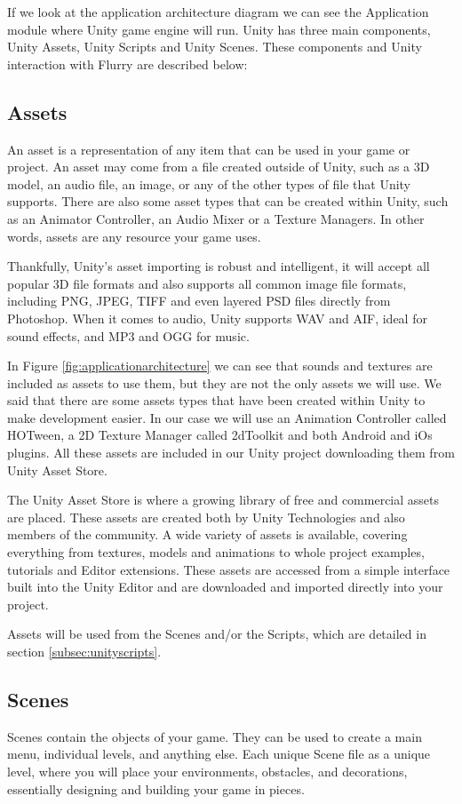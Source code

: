 If we look at the application architecture diagram we can see the Application module where Unity game engine will run. Unity has three main components, Unity Assets, Unity Scripts and Unity Scenes. These components and Unity interaction with Flurry are described below:

\subsection{Assets}
An asset is a representation of any item that can be used in your game or project. An asset may come from a file created outside of Unity, such as a 3D model, an audio file, an image, or any of the other types of file that Unity supports. There are also some asset types that can be created within Unity, such as an Animator Controller, an Audio Mixer or a Texture Managers. In other words, assets are any resource your game uses.

Thankfully, Unity’s asset importing is robust and intelligent, it will accept all popular 3D file formats and also supports all common image file formats, including PNG, JPEG, TIFF and even layered PSD files directly from Photoshop. When it comes to audio, Unity supports WAV and AIF, ideal for sound effects, and MP3 and OGG for music.

In Figure \ref{fig:applicationarchitecture} we can see that sounds and textures are included as assets to use them, but they are not the only assets we will use. We said that there are some assets types that have been created within Unity to make development easier. In our case we will use an Animation Controller called HOTween, a 2D Texture Manager called 2dToolkit and both Android and iOs plugins. All these assets are included in our Unity project downloading them from Unity Asset Store.

The Unity Asset Store is where a growing library of free and commercial assets are placed. These assets are created both by Unity Technologies and also members of the community. A wide variety of assets is available, covering everything from textures, models and animations to whole project examples, tutorials and Editor extensions. These assets are accessed from a simple interface built into the Unity Editor and are downloaded and imported directly into your project.

Assets will be used from the Scenes and/or the Scripts, which are detailed in section \ref{subsec:unityscripts}.

\subsection{Scenes}
Scenes contain the objects of your game. They can be used to create a main menu, individual levels, and anything else. Each unique Scene file as a unique level, where you will place your environments, obstacles, and decorations, essentially designing and building your game in pieces.

